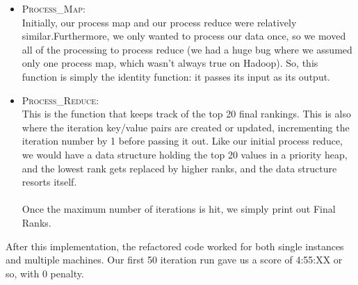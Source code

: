 \begin{itemize}
    \\ \\
    We did notice, however, that some datasets that we mined did not include NodeId entries for nodes that did not have any outgoing edges. The given datasets that were given did include entries for no outgoing edges, but according to Piazza, there may also be cases where no entries exist for such nodes. In this case, we would simply just create a new key/value pair with that NodeId, so we would be essentially adding an entry.
    \\\\
    In addition, for nodes with no outgoing edges, and thus no adjacency list, we added a new an adjacency list to itself so that it would contribute completely to itself, by definition of pagerank. 
    \\ \\
    Just like PageRank Map, we do not deal with iterations here. We just pass them along.

    The output for this function is simply:
    \begin{center}
      NodeId:[NODEID] \hspace{8mm} [CURRENT\_RANK],[PREVIOUS\_RANK],[ADJACENCY\_LIST]
    \end{center}
    or
    \begin{center}
      `Iters' \hspace{8mm} [ITERATIONS]
    \end{center}

  \item \textsc{Process\_Map}: \\
    Initially, our process map and our process reduce were relatively similar.Furthermore, we only wanted to process our data once, so we moved all of the processing to process reduce (we had a huge bug where we assumed only one process map, which wasn't always true on Hadoop). So, this function is simply the identity function: it passes its input as its output.

  \item \textsc{Process\_Reduce}: \\
    This is the function that keeps track of the top 20 final rankings. This is also where the iteration key/value pairs are created or updated, incrementing the iteration number by 1 before passing it out. Like our initial process reduce, we would have a data structure holding the top 20 values in a priority heap, and the lowest rank gets replaced by higher ranks, and the data structure resorts itself.
    \\ \\
    Once the maximum number of iterations is hit, we simply print out Final Ranks.
\end{itemize}
After this implementation, the refactored code worked for both single instances and multiple machines. Our first 50 iteration run gave us a score of 4:55:XX or so, with 0 penalty. 

